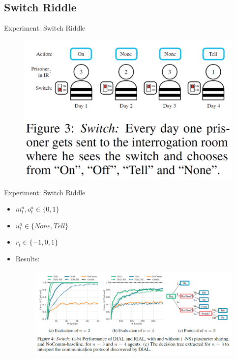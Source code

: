 \documentclass[mathserif]{beamer}
\begin{document}
\subsection{Switch Riddle}
\begin{frame}{Experiment: Switch Riddle}
  \begin{figure}
    \centering
    \includegraphics[scale=0.5]{fig/5}
  \end{figure}
\end{frame}

\begin{frame}{Experiment: Switch Riddle}
  \begin{itemize}
    \item $m_{t}^{a},o_{t}^{a}\in\{0,1\}$
    \item $u_{t}^{a}\in\{None,Tell\}$
    \item $r_{t}\in\{-1,0,1\}$
    \item Results:
    \begin{figure}
      \centering
      \includegraphics[scale=0.4]{fig/6}
    \end{figure}
  \end{itemize}
\end{frame}
\end{document}
